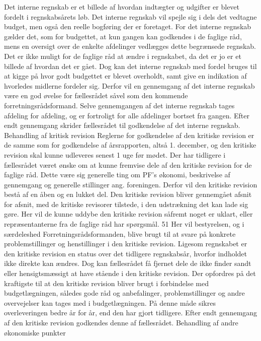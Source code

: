 Det interne regnskab er et billede af hvordan indtægter og udgifter er blevet fordelt i regnskabsårets løb. Det interne
regnskab vil spejle sig i dels det vedtagne budget, men også den reelle bogføring der er foretaget.
For det interne regnskab gælder det, som for budgettet, at kun gangen kan godkendes i de faglige råd, mens en oversigt
over de enkelte afdelinger vedlægges dette begrænsede regnskab.
Det er ikke muligt for de faglige råd at ændre i regnskabet, da det er jo er et billede af hvordan det er gået.
Dog kan det interne regnskab med fordel bruges til at kigge på hvor godt budgettet er blevet overholdt, samt give en
indikation af hvorledes midlerne fordeler sig. Derfor vil en gennemgang af det interne regnskab være en god øvelse for
fællesrådet såvel som den kommende forretningsrådsformand.
Selve gennemgangen af det interne regnskab tages afdeling for afdeling, og er fortroligt for alle afdelinger bortset fra
gangen.
Efter endt gennemgang skrider fællesrådet til godkendelse af det interne regnskab.
Behandling af kritisk revision
Reglerne for godkendelse af den kritiske revision er de samme som for godkendelse af årsrapporten, altså 1. december,
og den kritiske revision skal kunne udleveres senest 1 uge før mødet.
Der har tidligere i fællesrådet været ønske om at kunne fremvise dele af den kritiske revision for de faglige råd. Dette
være sig generelle ting om PF’s økonomi, beskrivelse af gennemgang og generelle stillinger ang. foreningen. Derfor vil
den kritiske revision bestå af en åben og en lukket del.
Den kritiske revision bliver gennemgået afsnit for afsnit, med de kritiske revisorer tilstede, i den udstrækning det kan
lade sig gøre. Her vil de kunne uddybe den kritiske revision såfremt noget er uklart, eller repræsentanterne fra de faglige
råd har spørgsmål.
51
Her vil bestyrelsen, og i særdeleshed Forretningsrådsformanden, blive brugt til at svare på konkrete problemstillinger og
henstillinger i den kritiske revision.
Ligesom regnskabet er den kritiske revision en status over det tidligere regnskabsår, hvorfor indholdet ikke direkte kan
ændres. Dog kan fællesrådet få fjernet dele de ikke finder sandt eller hensigtsmæssigt at have stående i den kritiske
revision.
Der opfordres på det kraftigste til at den kritiske revision bliver brugt i forbindelse med budgetlægningen, således gode
råd og anbefalinger, problemstillinger og andre overvejelser kan tages med i budgetlægningen. På denne måde sikres
overleveringen bedre år for år, end den har gjort tidligere.
Efter endt gennemgang af den kritiske revision godkendes denne af fællesrådet.
Behandling af andre økonomiske punkter
